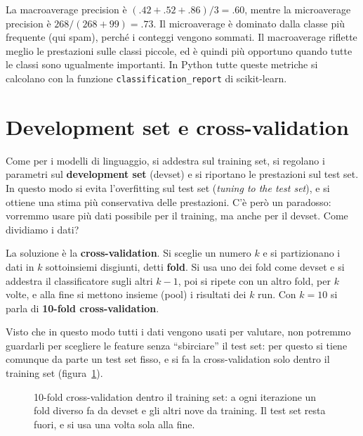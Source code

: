 La macroaverage precision è $(.42 + .52 + .86)/3 = .60$, mentre la microaverage precision è $268/(268 + 99) = .73$. Il microaverage è dominato dalla classe più frequente (qui spam), perché i conteggi vengono sommati. Il macroaverage riflette meglio le prestazioni sulle classi piccole, ed è quindi più opportuno quando tutte le classi sono ugualmente importanti. In Python tutte queste metriche si calcolano con la funzione \texttt{classification\_report} di scikit-learn.

\section{Development set e cross-validation}
Come per i modelli di linguaggio, si addestra sul training set, si regolano i parametri sul \textbf{development set} (devset) e si riportano le prestazioni sul test set. In questo modo si evita l'overfitting sul test set (\textit{tuning to the test set}), e si ottiene una stima più conservativa delle prestazioni. C'è però un paradosso: vorremmo usare più dati possibile per il training, ma anche per il devset. Come dividiamo i dati?

La soluzione è la \textbf{cross-validation}. Si sceglie un numero $k$ e si partizionano i dati in $k$ sottoinsiemi disgiunti, detti \textbf{fold}. Si usa uno dei fold come devset e si addestra il classificatore sugli altri $k - 1$, poi si ripete con un altro fold, per $k$ volte, e alla fine si mettono insieme (pool) i risultati dei $k$ run. Con $k = 10$ si parla di \textbf{10-fold cross-validation}.

Visto che in questo modo tutti i dati vengono usati per valutare, non potremmo guardarli per scegliere le feature senza \enquote{sbirciare} il test set: per questo si tiene comunque da parte un test set fisso, e si fa la cross-validation solo dentro il training set (figura~\ref{fig:cv}).

\begin{figure}[htbp]
\centering
{}
\caption{10-fold cross-validation dentro il training set: a ogni iterazione un fold diverso fa da devset e gli altri nove da training. Il test set resta fuori, e si usa una volta sola alla fine.}
\label{fig:cv}
\end{figure}

